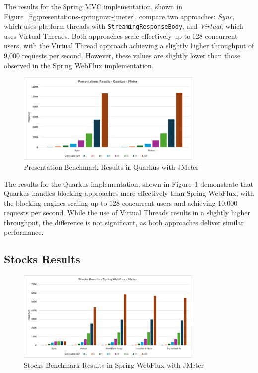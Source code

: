 The results for the Spring MVC implementation, shown in
Figure~\ref{fig:presentations-springmvc-jmeter}, compare two approaches:
\textit{Sync}, which uses platform threads with \texttt{StreamingResponseBody},
and \textit{Virtual}, which uses Virtual Threads. Both approaches scale
effectively up to 128 concurrent users, with the Virtual Thread approach
achieving a slightly higher throughput of 9,000 requests per second. However,
these values are slightly lower than those observed in the Spring WebFlux
implementation.

\begin{figure}[h]
     \isPreprints{\centering}{}
     \includegraphics[width=0.8\textwidth]{./Graphs/presentations-quarkus-jmeter.png}
     \caption{Presentation Benchmark Results in Quarkus with JMeter}\label{fig:presentations-quarkus-jmeter}
\end{figure}

The results for the Quarkus implementation, shown in
Figure~\ref{fig:presentations-quarkus-jmeter} demonstrate that Quarkus handles
blocking approaches more effectively than Spring WebFlux, with the blocking
engines scaling up to 128 concurrent users and achieving 10,000 requests per
second. While the use of Virtual Threads results in a slightly higher
throughput, the difference is not significant, as both approaches deliver
similar performance.

\subsection{Stocks Results}

\begin{figure}[h]
     \isPreprints{\centering}{}
     \includegraphics[width=0.8\textwidth]{./Graphs/stocks-webflux-jmeter.png}
     \caption{Stocks Benchmark Results in Spring WebFlux with JMeter}\label{fig:stocks-webflux-jmeter}
\end{figure}

